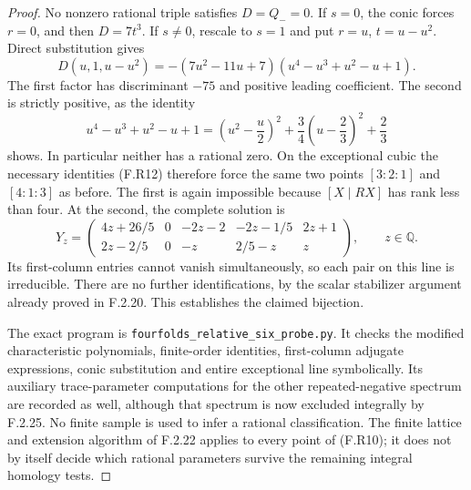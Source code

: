 \begin{proof}
No nonzero rational triple satisfies $D=Q_-=0$.
If $s=0$, the conic forces $r=0$, and then $D=7t^3$.
If $s\ne0$, rescale to $s=1$ and put
$r=u$, $t=u-u^2$.  Direct substitution gives
\[
 D(u,1,u-u^2)=
 -(7u^2-11u+7)(u^4-u^3+u^2-u+1).
 \tag{F.R13}
\]
The first factor has discriminant $-75$ and positive
leading coefficient.  The second is strictly positive,
as the identity
\[
 u^4-u^3+u^2-u+1
 =\left(u^2-\frac u2\right)^2
  +\frac34\left(u-\frac23\right)^2+\frac23
\]
shows.  In particular neither has a rational zero.
On the exceptional cubic the necessary identities (F.R12)
therefore force the same two points $[3:2:1]$ and $[4:1:3]$
as before.  The first is again impossible because
$[X\mid RX]$ has rank less than four.
At the second, the complete solution is
\[
 Y_z=\begin{pmatrix}
 4z+26/5&0&-2z-2&-2z-1/5&2z+1\\
 2z-2/5&0&-z&2/5-z&z
 \end{pmatrix},\qquad z\in\mathbb Q.
 \tag{F.R14}
\]
Its first-column entries cannot vanish simultaneously,
so each pair on this line is irreducible.
There are no further identifications, by the scalar
stabilizer argument already proved in F.2.20.
This establishes the claimed bijection.

The exact program is
\texttt{fourfolds\_relative\_six\_probe.py}.
It checks the modified characteristic polynomials, finite-order
identities, first-column adjugate expressions, conic
substitution and entire exceptional line symbolically.
Its auxiliary trace-parameter computations for the other
repeated-negative spectrum are recorded as well, although
that spectrum is now excluded integrally by F.2.25.
No finite sample is used to infer a rational classification.
The finite lattice and extension algorithm of F.2.22 applies
to every point of (F.R10); it does not by itself decide
which rational parameters survive the remaining integral
homology tests.
\end{proof}
